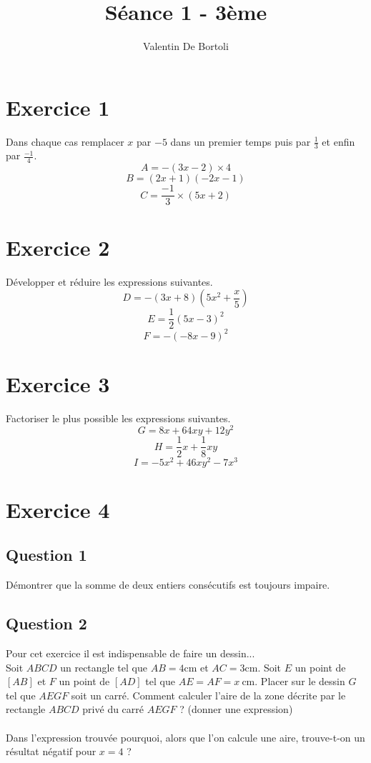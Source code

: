 \documentclass[10pt,a4paper]{article}
\title{Séance 1 - 3ème}
\author{Valentin De Bortoli}
\begin{document}
\maketitle
\section{Exercice 1}
Dans chaque cas remplacer $x$ par $-5$ dans un premier temps puis par $\frac{1}{3}$ et enfin par $\frac{-1}{4}$.
\begin{equation}
A=-(3 x -2) \times 4
\end{equation}
\begin{equation}
B=(2 x+1)(-2x-1)
\end{equation}
\begin{equation}
C=\frac{-1}{3}\times (5x+2) 
\end{equation}
\section{Exercice 2}
Développer et réduire les expressions suivantes.
\begin{equation}
D=-(3x+8)(5x^2+\frac{x}{5})
\end{equation}
\begin{equation}
E=\frac{1}{2}(5x-3)^2
\end{equation}
\begin{equation}
F=-(-8x-9)^2
\end{equation}
\section{Exercice 3}
Factoriser le plus possible les expressions suivantes.
\begin{equation}
G=8x+64xy+12y^2
\end{equation}
\begin{equation}
H=\frac{1}{2}x+\frac{1}{8}xy
\end{equation}
\begin{equation}
I=-5x^2+46xy^2-7x^3
\end{equation}
\section{Exercice 4}
\subsection{Question 1}
Démontrer que la somme de deux entiers consécutifs est toujours impaire.
\subsection{Question 2}
Pour cet exercice il est indispensable de faire un dessin...\\
Soit $ABCD$ un rectangle tel que $AB=4\text{cm}$ et $AC=3 \text{cm}$. Soit $E$ un point de $[AB]$ et $F$ un point de $[AD]$ tel que $AE=AF=x \ \text{cm}$. Placer sur le dessin $G$ tel que $AEGF$ soit un carré. Comment calculer l'aire de la zone décrite par le rectangle $ABCD$ privé du carré $AEGF$ ? (donner une expression) \\
~\\
Dans l'expression trouvée pourquoi, alors que l'on calcule une aire, trouve-t-on un résultat négatif pour $x=4$ ?
\end{document}
